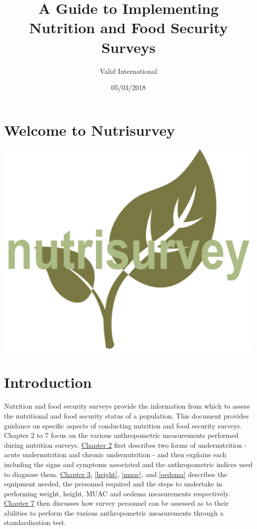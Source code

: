 \documentclass[12pt,]{book}
\title{A Guide to Implementing Nutrition and Food Security Surveys}
\author{Valid International}
\date{05/03/2018}
\theoremstyle{definition}
\theoremstyle{definition}
\theoremstyle{definition}
\theoremstyle{remark}
\begin{document}
\maketitle

{
\hypersetup{linkcolor=black}
\setcounter{tocdepth}{1}
\tableofcontents
}
\hypertarget{welcome-to-nutrisurvey}{%
\chapter*{Welcome to Nutrisurvey}\label{welcome-to-nutrisurvey}}

\includegraphics{images/nutrisurvey.png}

\hypertarget{introduction}{%
\chapter{Introduction}\label{introduction}}

Nutrition and food security surveys provide the information from which
to assess the nutritional and food security status of a population. This
document provides guidance on specific aspects of conducting nutrition
and food security surveys. Chapter 2 to 7 focus on the various
anthropometric measurements performed during nutrition surveys.
\protect\hyperlink{anthro}{Chapter 2} first describes two forms of
undernutrition - acute undernutrition and chronic undernutrition - and
then explains each including the signs and symptoms associated and the
anthropometric indices used to diagnose them.
\protect\hyperlink{weight}{Chapter 3}, \ref{height}, \ref{muac}, and
\ref{oedema} describes the equipment needed, the personnel required and
the steps to undertake in performing weight, height, MUAC and oedema
measurements respectively. \protect\hyperlink{standard}{Chapter 7} then
discusses how survey personnel can be assessed as to their abilities to
perform the various anthropometric measurements through a
standardisation test.
\end{document}
